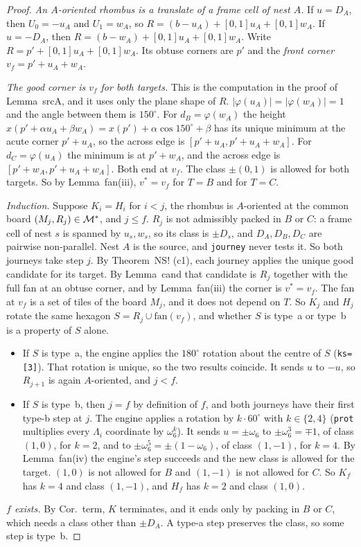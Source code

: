 \documentclass[11pt]{article}
\theoremstyle{definition}\newtheorem{definition}[theorem]{Definition}\newtheorem{remark}[theorem]{Remark}
\begin{document}
\begin{proof}
\emph{An $A$-oriented rhombus is a translate of a frame cell of nest $A$.} If $u=D_A$, then $U_0=-u_A$ and $U_1=w_A$, so
$R=(b-u_A)+[0,1]u_A+[0,1]w_A$. If $u=-D_A$, then $R=(b-w_A)+[0,1]u_A+[0,1]w_A$. Write $R=p'+[0,1]u_A+[0,1]w_A$. Its obtuse corners are
$p'$ and the \emph{front corner} $v_f=p'+u_A+w_A$.

\emph{The good corner is $v_f$ for both targets.} This is the computation in the proof of Lemma~srcA, and it uses only the plane
shape of $R$. $|\varphi(u_A)|=|\varphi(w_A)|=1$ and the angle between them is $150^\circ$. For $d_B=\varphi(w_A)$ the height
$x(p'+\alpha u_A+\beta w_A)=x(p')+\alpha\cos150^\circ+\beta$ has its unique minimum at the acute corner $p'+u_A$, so the across edge is
$[p'+u_A,p'+u_A+w_A]$. For $d_C=\varphi(u_A)$ the minimum is at $p'+w_A$, and the across edge is $[p'+w_A,p'+u_A+w_A]$. Both end at
$v_f$. The class $\pm(0,1)$ is allowed for both targets. So by Lemma~fan(iii), $v^*=v_f$ for $T=B$ and for $T=C$.

\emph{Induction.} Suppose $K_i=H_i$ for $i<j$, the rhombus is $A$-oriented at the common board $(M_j,R_j)\in\mathcal M^*$, and $j\le f$.
$R_j$ is not admissibly packed in $B$ or $C$: a frame cell of nest $s$ is spanned by $u_s,w_s$, so its class is $\pm D_s$, and
$D_A,D_B,D_C$ are pairwise non-parallel. Nest $A$ is the source, and \texttt{journey} never tests it. So both journeys take step $j$.
By Theorem~NS! (c1), each journey applies the unique good candidate for its target. By Lemma~cand that candidate is $R_j$ together with
the full fan at an obtuse corner, and by Lemma~fan(iii) the corner is $v^*=v_f$. The fan at $v_f$ is a set of tiles of the board
$M_j$, and it does not depend on $T$. So $K_j$ and $H_j$ rotate the same hexagon $S=R_j\cup\mathrm{fan}(v_f)$, and whether $S$ is type~a or type~b
is a property of $S$ alone.
\begin{itemize}
\item If $S$ is type~a, the engine applies the $180^\circ$ rotation about the centre of $S$ (\texttt{ks=[3]}). That rotation is unique,
so the two results coincide. It sends $u$ to $-u$, so $R_{j+1}$ is again $A$-oriented, and $j<f$.
\item If $S$ is type~b, then $j=f$ by definition of $f$, and both journeys have their first type-b step at $j$. The engine applies a
rotation by $k\cdot60^\circ$ with $k\in\{2,4\}$ (\texttt{prot} multiplies every $\Lambda_i$ coordinate by $\omega_6^k$). It sends
$u=\pm\omega_6$ to $\pm\omega_6^{3}=\mp1$, of class $(1,0)$, for $k=2$, and to $\pm\omega_6^{5}=\pm(1-\omega_6)$, of class $(1,-1)$, for $k=4$.
By Lemma~fan(iv) the engine's step succeeds and the new class is allowed for the target. $(1,0)$ is not allowed for $B$ and
$(1,-1)$ is not allowed for $C$. So $K_f$ has $k=4$ and class $(1,-1)$, and $H_f$ has $k=2$ and class $(1,0)$.
\end{itemize}
\emph{$f$ exists.} By Cor.~term, $K$ terminates, and it ends only by packing in $B$ or $C$, which needs a class other than $\pm D_A$.
A type-a step preserves the class, so some step is type~b.
\end{proof}
\end{document}
